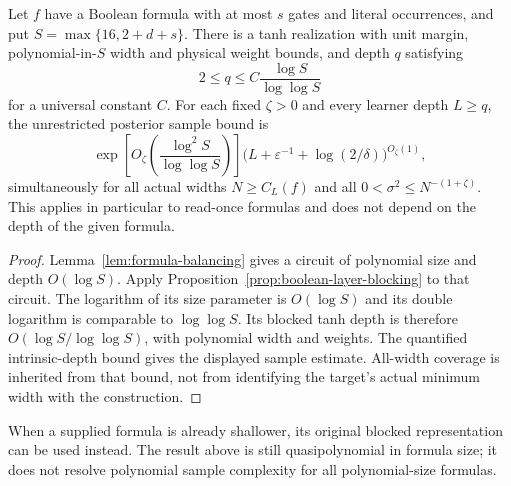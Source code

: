 \begin{corollary}
\label{cor:arbitrary-formula-learning}
Let $f$ have a Boolean formula with at most $s$ gates and literal
occurrences, and put $S=\max\{16,2+d+s\}$. There is a tanh realization
with unit margin, polynomial-in-$S$ width and physical weight bounds,
and depth $q$ satisfying
\[
 2\le q\le C\frac{\log S}{\log\log S}
\]
for a universal constant $C$. For each fixed $\zeta>0$ and every
learner depth $L\ge q$, the unrestricted posterior sample bound is
\[
 \exp\!\left[O_\zeta\!\left(\frac{\log^2S}{\log\log S}\right)\right]
 \bigl(L+\varepsilon^{-1}+\log(2/\delta)\bigr)^{O_\zeta(1)},
\]
simultaneously for all actual widths $N\ge C_L(f)$ and all
$0<\sigma^2\le N^{-(1+\zeta)}$.
This applies in particular to read-once formulas and does not depend
on the depth of the given formula.
\end{corollary}

\begin{proof}
Lemma~\ref{lem:formula-balancing} gives a circuit of polynomial size
and depth $O(\log S)$. Apply
Proposition~\ref{prop:boolean-layer-blocking} to that circuit.
The logarithm of its size parameter is $O(\log S)$ and its double
logarithm is comparable to $\log\log S$. Its blocked tanh depth is
therefore $O(\log S/\log\log S)$, with polynomial width and weights.
The quantified intrinsic-depth bound gives the displayed sample
estimate. All-width coverage is inherited from that bound, not from
identifying the target's actual minimum width with the construction.
\end{proof}

When a supplied formula is already shallower, its original blocked
representation can be used instead. The result above is still
quasipolynomial in formula size; it does not resolve polynomial sample
complexity for all polynomial-size formulas.
